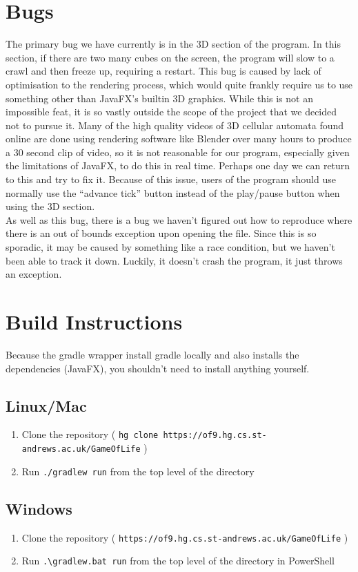 \documentclass[11pt]{article}
\begin{document}
\section{Bugs}
\label{sec:orgfdb8c37}
The primary bug we have currently is in the 3D section of the program.  In this
section, if there are two many cubes on the screen, the program will slow to a
crawl and then freeze up, requiring a restart.  This bug is caused by lack of
optimisation to the rendering process, which would quite frankly require us to
use something other than JavaFX's builtin 3D graphics.  While this is not an
impossible feat, it is so vastly outside the scope of the project that we
decided not to pursue it.  Many of the high quality videos of 3D cellular
automata found online are done using rendering software like Blender over many
hours to produce a 30 second clip of video, so it is not reasonable for our
program, especially given the limitations of JavaFX, to do this in real time.
Perhaps one day we can return to this and try to fix it.  Because of this issue,
users of the program should use normally use the ``advance tick'' button instead
of the play/pause button when using the 3D section.\\

As well as this bug, there is a bug we haven't figured out how to reproduce
where there is an out of bounds exception upon opening the file.  Since this is
so sporadic, it may be caused by something like a race condition, but we haven't
been able to track it down.  Luckily, it doesn't crash the program, it just
throws an exception.

\section{Build Instructions}
\label{sec:orge71745a}
Because the gradle wrapper install gradle locally and also installs the
dependencies (JavaFX),  you shouldn't need to install anything yourself.
\subsection{Linux/Mac}
\label{sec:org904215a}
\begin{enumerate}
\item Clone the repository ( \texttt{hg clone https://of9.hg.cs.st-andrews.ac.uk/GameOfLife} )
\item Run \texttt{./gradlew run} from the top level of the directory
\end{enumerate}
\subsection{Windows}
\label{sec:orgdfa1136}
\begin{enumerate}
\item Clone the repository ( \texttt{https://of9.hg.cs.st-andrews.ac.uk/GameOfLife} )
\item Run \texttt{.\textbackslash{}gradlew.bat run} from the top level of the directory in
PowerShell
\end{enumerate}
\end{document}
